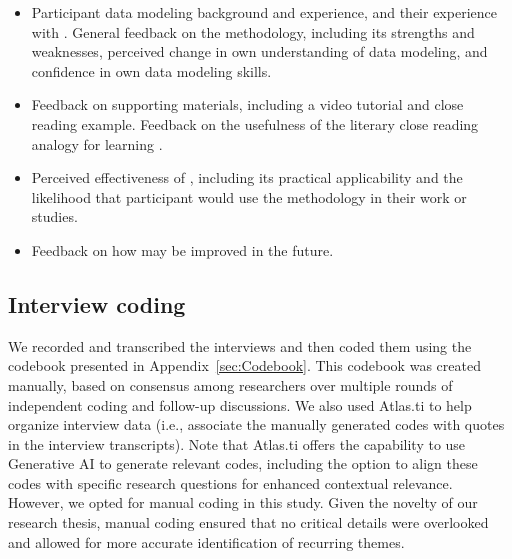 \begin{itemize}    
    \item Participant data modeling background and experience, and their experience with \credal.  General feedback on the methodology, including its strengths and weaknesses, perceived change in own understanding of data modeling, and confidence in own data modeling skills. 

    \item Feedback on supporting materials, including a video tutorial and close reading example.  Feedback on the usefulness of the literary close reading analogy for learning \credal.

    \item Perceived effectiveness of \credal, including its practical applicability and the likelihood that participant would use the methodology in their work or studies.
        
    \item Feedback on how \credal may be improved in the future.
\end{itemize}

\subsection{Interview coding}
\label{sec:eval:coding}

We recorded and transcribed the interviews and then coded them using the codebook presented in Appendix~\ref{sec:Codebook}.  This codebook was created manually, based on consensus among researchers over multiple rounds of independent coding and follow-up discussions.  We also used Atlas.ti to help organize interview data (i.e., associate the manually generated codes with quotes in the interview transcripts). 
Note that Atlas.ti offers the capability to use Generative AI to generate relevant codes, including the option to align these codes with specific research questions for enhanced contextual relevance.  However, we opted for manual coding in this study. Given the novelty of our research thesis, manual coding ensured that no critical details were overlooked and allowed for more accurate identification of recurring themes.

